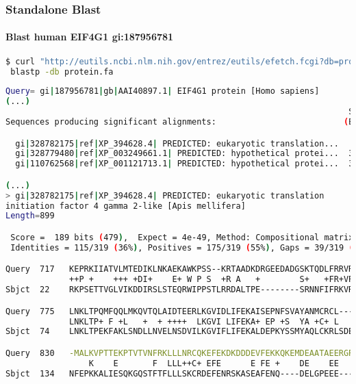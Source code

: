 \documentclass{beamer}
\begin{document}
\begin{frame}[fragile]
\frametitle{Standalone Blast}
\framesubtitle{Blast human EIF4G1 gi:187956781 }
\begin{lstlisting}[language=bash,basicstyle=\tiny,breaklines=true]
$ curl "http://eutils.ncbi.nlm.nih.gov/entrez/eutils/efetch.fcgi?db=protein&rettype=fasta&id=187956781" |\
 blastp -db protein.fa
\end{lstlisting}
\begin{lstlisting}[language=bash,basicstyle=\tiny,breaklines=false]
Query= gi|187956781|gb|AAI40897.1| EIF4G1 protein [Homo sapiens]
(...)
                                                                      Score     E
Sequences producing significant alignments:                          (Bits)  Value

  gi|328782175|ref|XP_394628.4| PREDICTED: eukaryotic translation...   189    4e-49
  gi|328779480|ref|XP_003249661.1| PREDICTED: hypothetical protei...  38.1    0.017
  gi|110762568|ref|XP_001121713.1| PREDICTED: hypothetical protei...  38.1    0.018

(...)
> gi|328782175|ref|XP_394628.4| PREDICTED: eukaryotic translation 
initiation factor 4 gamma 2-like [Apis mellifera]
Length=899

 Score =  189 bits (479),  Expect = 4e-49, Method: Compositional matrix adjust.
 Identities = 115/319 (36%), Positives = 175/319 (55%), Gaps = 39/319 (12%)

Query  717   KEPRKIIATVLMTEDIKLNKAEKAWKPSS--KRTAADKDRGEEDADGSKTQDLFRRVRSI  774
             ++P +    +++ +DI+    E+ W P S  +R A   +        S+   +FR+VR I
Sbjct  22    RKPSETTVGLVIKDDIRSLSTEQRWIPPSTLRRDALTPE--------SRNNFIFRKVRGI  73

Query  775   LNKLTPQMFQQLMKQVTQLAIDTEERLKGVIDLIFEKAISEPNFSVAYANMCRCL-----  829
             LNKLTP+ F +L   +  + ++++  LKGVI LIFEKA+ EP +S  YA +C+ L     
Sbjct  74    LNKLTPEKFAKLSNDLLNVELNSDVILKGVIFLIFEKALDEPKYSSMYAQLCKRLSDEAA  133

Query  830   -MALKVPTTEKPTVTVNFRKLLLNRCQKEFEKDKDDDEVFEKKQKEMDEAATAEERGRLK  888
                 K    E       F  LLL++C+ EFE      E FE +    DE    EE     
Sbjct  134   NFEPKKALIESQKGQSTFTFLLLSKCRDEFENRSKASEAFENQ----DELGPEEE-----  184

\end{lstlisting}
\end{frame}
\end{document}
